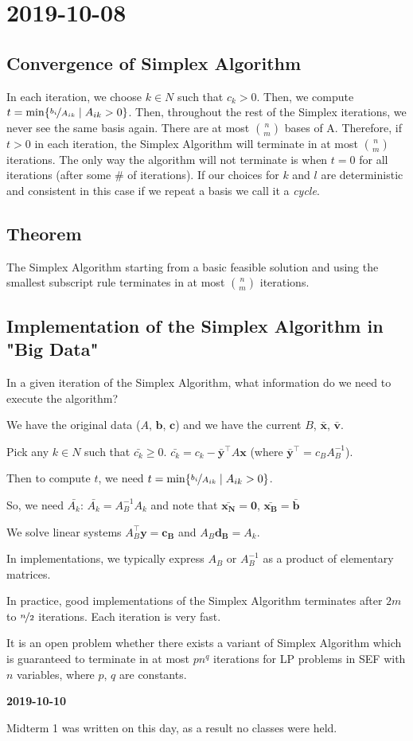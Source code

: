 \section{2019-10-08}
\subsection{Convergence of Simplex Algorithm}
In each iteration, we choose $k\in N$ such that $c_k>0$. Then, we compute 
$t=\min\{\nicefrac{b_i}{A_{ik}}\mid A_{ik}>0\}$. Then, throughout the
rest of the Simplex iterations, we never see the same basis again. 
There are at most $\binom{n}{m}$ bases of A. Therefore, if $t>0$ in each iteration,
the Simplex Algorithm will terminate in at most $\binom{n}{m}$ iterations. The only
way the algorithm will not terminate is when $t=0$ for all iterations
(after some \# of iterations). If our choices for $k$ and $l$ are deterministic and
consistent in this case if we repeat a basis we call it a \emph{cycle}.

\begin{thmbox}
    \subsection{Theorem}
    The Simplex Algorithm starting from a basic feasible solution and using the
    smallest subscript rule terminates in at most $\binom{n}{m}$ iterations.
\end{thmbox}

\subsection{Implementation of the Simplex Algorithm in "Big Data"}
In a given iteration of the Simplex Algorithm, what information do we need to
execute the algorithm?


We have the original data ($A$, $\mathbf{b}$, $\mathbf{c}$) and we have the
current $B$, $\mathbf{\bar{x}}$, $\mathbf{\bar{v}}$.

Pick any $k\in N$ such that $\bar{c_k}\ge 0$. $\bar{c_k}=c_k-\mathbf{\bar{y}}^\top  A\mathbf{x}$ 
(where $\mathbf{\bar{y}}^\top =c_B A_B^{-1}$).

Then to compute $t$, we need
$t=\min\{\nicefrac{b_i}{A_{ik}}\mid A_{ik}>0\}$.

So, we need
$\bar{A_k}$: $\bar{A_k}=A_B^{-1}A_k$ and note that $\mathbf{\bar{x_N}}=\mathbf{0}$,
$\mathbf{\bar{x_B}}=\mathbf{\bar{b}}$


We solve linear systems $A_B^\top \mathbf{y}=\mathbf{c_B}$ and $A_B\mathbf{d_B}=A_k$.

In implementations, we typically express $A_B$ or $A_B^{-1}$ as a product of elementary
matrices.

In practice, good implementations of the Simplex Algorithm terminates after $2m$ to
$\nicefrac{n}{2}$ iterations. Each iteration is very fast.

It is an open problem whether there exists a variant of Simplex Algorithm which is
guaranteed to terminate in at most $pn^q$ iterations for LP problems in SEF with $n$
variables, where $p$, $q$ are constants.

\textbf{2019-10-10}

Midterm 1 was written on this day, as a result no classes were
held.
